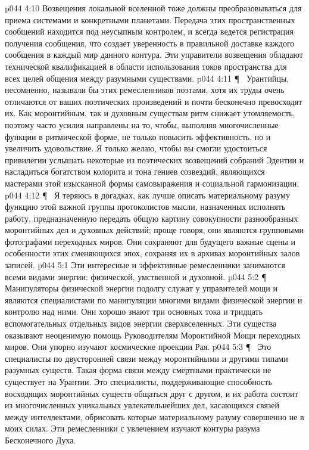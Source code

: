 \vs p044 4:10 Возвещения локальной вселенной тоже должны преобразовываться для приема системами и конкретными планетами. Передача этих пространственных сообщений находится под неусыпным контролем, и всегда ведется регистрация получения сообщения, что создает уверенность в правильной доставке каждого сообщения в каждый мир данного контура. Эти управители возвещения обладают технической квалификацией в области использования токов пространства для всех целей общения между разумными существами.
\vs p044 4:11 \P\ \bibnobreakspace {} Урантийцы, несомненно, называли бы этих ремесленников поэтами, хотя их труды очень отличаются от ваших поэтических произведений и почти бесконечно превосходят их. Как моронтийным, так и духовным существам ритм снижает утомляемость, поэтому часто усилия направлены на то, чтобы, выполняя многочисленные функции в ритмической форме, не только повысить эффективность, но и увеличить удовольствие. Я только желаю, чтобы вы смогли удостоиться привилегии услышать некоторые из поэтических возвещений собраний Эдентии и насладиться богатством колорита и тона гениев созвездий, являющихся мастерами этой изысканной формы самовыражения и социальной гармонизации.
\vs p044 4:12 \P\ \bibnobreakspace {} Я теряюсь в догадках, как лучше описать материальному разуму функцию этой важной группы протоколистов мысли, назначенных исполнять работу, предназначенную передать общую картину совокупности разнообразных моронтийных дел и духовных действий; проще говоря, они являются групповыми фотографами переходных миров. Они сохраняют для будущего важные сцены и особенности этих сменяющихся эпох, сохраняя их в архивах моронтийных залов записей.
\vs p044 5:1 Эти интересные и эффективные ремесленники занимаются всеми видами энергии: физической, умственной и духовной.
\vs p044 5:2 \P\ \bibnobreakspace {} Манипуляторы физической энергии подолгу служат у управителей мощи и являются специалистами по манипуляции многими видами физической энергии и контролю над ними. Они хорошо знают три основных тока и тридцать вспомогательных отдельных видов энергии сверхвселенных. Эти существа оказывают неоценимую помощь Руководителям Моронтийной Мощи переходных миров. Они упорно изучают космические проекции Рая.
\vs p044 5:3 \P\ \bibnobreakspace {} Это специалисты по двусторонней связи между моронтийными и другими типами разумных существ. Такая форма связи между смертными практически не существует на Урантии. Это специалисты, поддерживающие способность восходящих моронтийных существ общаться друг с другом, и их работа состоит из многочисленных уникальных увлекательнейших дел, касающихся связей между интеллектами, обрисовать которые материальному разуму совершенно не в моих силах. Эти ремесленники с увлечением изучают контуры разума Бесконечного Духа.
